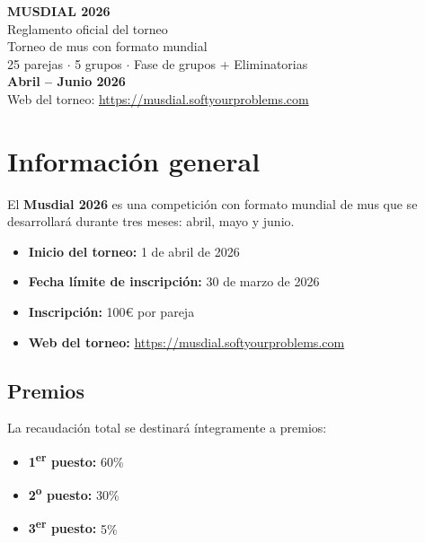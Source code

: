 \documentclass[11pt,a4paper]{article}
\begin{document}
\begin{center}
\vspace*{2cm}
{\Huge\bfseries MUSDIAL 2026}\\[0.5cm]
{\Large Reglamento oficial del torneo}\\[2cm]
{\large Torneo de mus con formato mundial}\\[0.3cm]
{\large 25 parejas $\cdot$ 5 grupos $\cdot$ Fase de grupos + Eliminatorias}\\[2cm]
{\large\textbf{Abril -- Junio 2026}}\\[1cm]
{\normalsize Web del torneo: \url{https://musdial.softyourproblems.com}}\\[3cm]
\end{center}
\thispagestyle{empty}
\newpage

\tableofcontents
\newpage

\section{Información general}

El \textbf{Musdial 2026} es una competición con formato mundial de mus que se desarrollará durante tres meses: abril, mayo y junio.

\begin{itemize}
    \item \textbf{Inicio del torneo:} 1 de abril de 2026
    \item \textbf{Fecha límite de inscripción:} 30 de marzo de 2026
    \item \textbf{Inscripción:} 100\euro{} por pareja
    \item \textbf{Web del torneo:} \url{https://musdial.softyourproblems.com}
\end{itemize}

\subsection{Premios}

La recaudación total se destinará íntegramente a premios:

\begin{itemize}
    \item \textbf{1\textsuperscript{er} puesto:} 60\%
    \item \textbf{2\textsuperscript{o} puesto:} 30\%
    \item \textbf{3\textsuperscript{er} puesto:} 5\%
\end{itemize}
\end{document}
